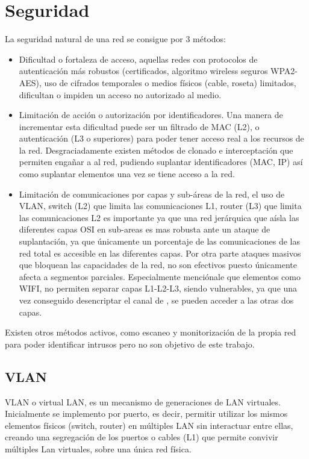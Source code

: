 \section{Seguridad}
La seguridad natural de una red se consigue por 3 métodos:
\begin{itemize}
    \item Dificultad o fortaleza de acceso, aquellas redes con protocolos de autenticación más robustos (certificados, algoritmo wireless seguros WPA2-AES), uso de cifrados temporales o medios físicos (cable, roseta) limitados, dificultan o impiden un acceso no autorizado al medio. 
    \item Limitación de acción o autorización por identificadores. Una manera de incrementar esta dificultad puede ser un filtrado de MAC (L2), o autenticación (L3 o superiores) para poder tener acceso real a los recursos de la red.  Desgraciadamente existen métodos de clonado e interceptación que permiten engañar a al red, pudiendo suplantar identificadores (MAC, IP) así como suplantar elementos una vez se tiene acceso a la red. 
    \item Limitación de comunicaciones por capas y sub-áreas de la red, el uso de VLAN, switch (L2) que limita las comunicaciones L1, router (L3) que limita las comunicaciones L2 es importante ya que una red jerárquica que aísla las diferentes capas OSI en sub-areas es mas robusta ante un ataque de suplantación, ya que únicamente un porcentaje de las comunicaciones de las red total es accesible en las diferentes capas. Por otra parte ataques masivos que bloquean las capacidades de la red, no son efectivos puesto únicamente afecta a segmentos parciales. Especialmente menciónale que elementos como WIFI, no permiten separar capas L1-L2-L3, siendo vulnerables, ya que una vez conseguido desencriptar el canal de , se pueden acceder a las otras dos capas.
\end{itemize}

Existen otros métodos activos, como escaneo y monitorización de la propia red para poder identificar intrusos pero no son objetivo de este trabajo.

\subsection{VLAN}\label{S:vlan}
VLAN o virtual LAN, es un mecanismo de generaciones de LAN virtuales.
Inicialmente se implemento por puerto, es decir, permitir utilizar los mismos elementos físicos (switch, router) en múltiples LAN sin interactuar entre ellas, creando una segregación de los puertos o cables (L1) que permite convivir múltiples Lan virtuales, sobre una única red física.

